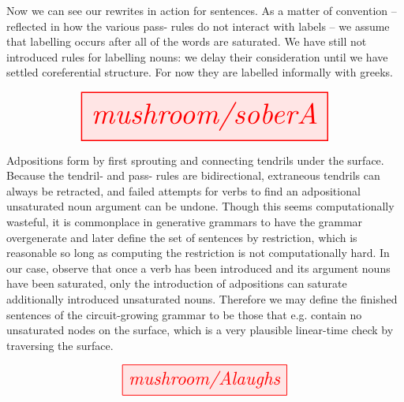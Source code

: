 \begin{myboxR}
\begin{example}\label{ex:soberA}
Now we can see our rewrites in action for sentences. As a matter of convention -- reflected in how the various pass- rules do not interact with labels -- we assume that labelling occurs after all of the words are saturated. We have still not introduced rules for labelling nouns: we delay their consideration until we have settled coreferential structure. For now they are labelled informally with greeks.
\end{example}
\[
\resizebox{0.75\textwidth}{!}{\tikzfig{mushroom/soberA}}
\]
\end{myboxR}
\clearpage

\begin{myboxR}
\begin{example}\label{ex:Alaughs}
Adpositions form by first sprouting and connecting tendrils under the surface. Because the tendril- and pass- rules are bidirectional, extraneous tendrils can always be retracted, and failed attempts for verbs to find an adpositional unsaturated noun argument can be undone. Though this seems computationally wasteful, it is commonplace in generative grammars to have the grammar overgenerate and later define the set of sentences by restriction, which is reasonable so long as computing the restriction is not computationally hard. In our case, observe that once a verb has been introduced and its argument nouns have been saturated, only the introduction of adpositions can saturate additionally introduced unsaturated nouns. Therefore we may define the finished sentences of the circuit-growing grammar to be those that e.g. contain no unsaturated nodes on the surface, which is a very plausible linear-time check by traversing the surface.
\end{example}
\[
\resizebox{0.5\textwidth}{!}{\tikzfig{mushroom/Alaughs}}
\]
\end{myboxR}
\clearpage

